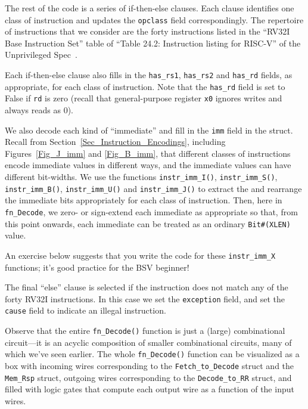 The rest of the code is a series of if-then-else clauses. Each clause
identifies one class of instruction and updates the \verb|opclass|
field correspondingly.  The repertoire of instructions that we
consider are the forty instructions listed in the ``RV32I Base
Instruction Set'' table of ``Table 24.2: Instruction listing for
RISC-V'' of the Unprivileged Spec~\cite{RISCV_Unpriv_2019_12_13}.

Each if-then-else clause also fills in the \verb|has_rs1|,
\verb|has_rs2| and \verb|has_rd| fields, as appropriate, for each
class of instruction.  Note that the \verb|has_rd| field is set to
False if \verb|rd| is zero (recall that general-purpose register
\verb|x0| ignores writes and always reads as 0).

We also decode each kind of ``immediate'' and fill in the \verb|imm|
field in the struct.  Recall from
Section~\ref{Sec_Instruction_Encodings}, including
Figures~\ref{Fig_J_imm} and \ref{Fig_B_imm}, that different classes of
instructions encode immediate values in different ways, and the
immediate values can have different bit-widths.  We use the functions
\verb|instr_imm_I()|, \verb|instr_imm_S()|, \verb|instr_imm_B()|,
\verb|instr_imm_U()| and \verb|instr_imm_J()| to extract the and
rearrange the immediate bits appropriately for each class of
instruction.  Then, here in \verb|fn_Decode|, we zero- or sign-extend
each immediate as appropriate so that, from this point onwards, each
immediate can be treated as an ordinary \verb|Bit#(XLEN)| value.

An exercise below suggests that you write the code for these
\verb|instr_imm_X| functions; it's good practice for the BSV beginner!

The final ``else'' clause is selected if the instruction does not
match any of the forty RV32I instructions.  In this case we set the
\verb|exception| field, and set the \verb|cause| field to indicate an
illegal instruction.

Observe that the entire \verb|fn_Decode()| function is just a (large)
combinational circuit---it is an acyclic composition of smaller
combinational circuits, many of which we've seen earlier.  The whole
\verb|fn_Decode()| function can be visualized as a box with incoming
wires corresponding to the \verb|Fetch_to_Decode| struct and the
\verb|Mem_Rsp| struct, outgoing wires corresponding to the
\verb|Decode_to_RR| struct, and filled with logic gates that compute
each output wire as a function of the input wires.


